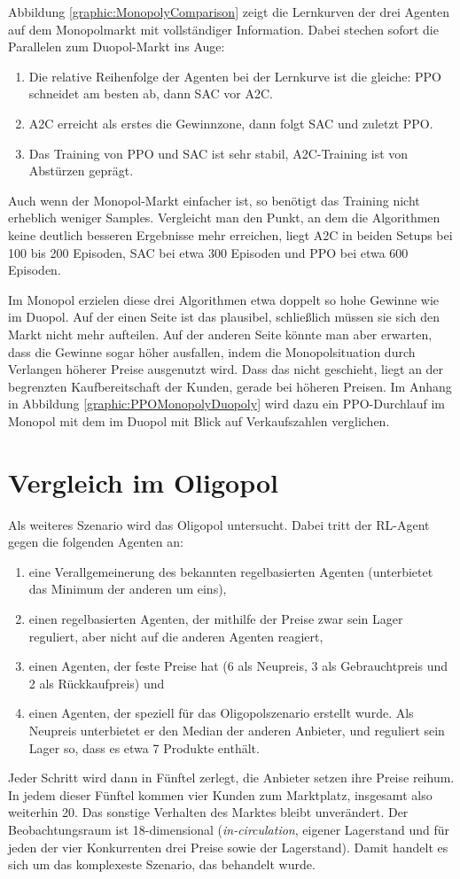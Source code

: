 Abbildung \ref{graphic:MonopolyComparison} zeigt die Lernkurven der drei Agenten auf dem Monopolmarkt mit vollständiger Information.
Dabei stechen sofort die Parallelen zum Duopol-Markt ins Auge:
\begin{enumerate}
	\item Die relative Reihenfolge der Agenten bei der Lernkurve ist die gleiche: PPO schneidet am besten ab, dann SAC vor A2C.
	\item A2C erreicht als erstes die Gewinnzone, dann folgt SAC und zuletzt PPO.
	\item Das Training von PPO und SAC ist sehr stabil, A2C-Training ist von Abstürzen geprägt.
\end{enumerate}
Auch wenn der Monopol-Markt einfacher ist, so benötigt das Training nicht erheblich weniger Samples.
Vergleicht man den Punkt, an dem die Algorithmen keine deutlich besseren Ergebnisse mehr erreichen, liegt A2C in beiden Setups bei 100 bis 200 Episoden, SAC bei etwa 300 Episoden und PPO bei etwa 600 Episoden.

Im Monopol erzielen diese drei Algorithmen etwa doppelt so hohe Gewinne wie im Duopol.
Auf der einen Seite ist das plausibel, schließlich müssen sie sich den Markt nicht mehr aufteilen.
Auf der anderen Seite könnte man aber erwarten, dass die Gewinne sogar höher ausfallen, indem die Monopolsituation durch Verlangen höherer Preise ausgenutzt wird.
Dass das nicht geschieht, liegt an der begrenzten Kaufbereitschaft der Kunden, gerade bei höheren Preisen.
Im Anhang in Abbildung \ref{graphic:PPOMonopolyDuopoly} wird dazu ein PPO-Durchlauf im Monopol mit dem im Duopol mit Blick auf Verkaufszahlen verglichen.

\section{Vergleich im Oligopol}
Als weiteres Szenario wird das Oligopol untersucht.
Dabei tritt der RL-Agent gegen die folgenden Agenten an:
\begin{enumerate}
	\item eine Verallgemeinerung des bekannten regelbasierten Agenten (unterbietet das Minimum der anderen um eins),
	\item einen regelbasierten Agenten, der mithilfe der Preise zwar sein Lager reguliert, aber nicht auf die anderen Agenten reagiert,
	\item einen Agenten, der feste Preise hat (6 als Neupreis, 3 als Gebrauchtpreis und 2 als Rückkaufpreis) und
	\item einen Agenten, der speziell für das Oligopolszenario erstellt wurde.
	Als Neupreis unterbietet er den Median der anderen Anbieter, und reguliert sein Lager so, dass es etwa 7 Produkte enthält.
\end{enumerate}
Jeder Schritt wird dann in Fünftel zerlegt, die Anbieter setzen ihre Preise reihum.
In jedem dieser Fünftel kommen vier Kunden zum Marktplatz, insgesamt also weiterhin 20.
Das sonstige Verhalten des Marktes bleibt unverändert.
Der Beobachtungsraum ist 18-dimensional (\textit{in-circulation}, eigener Lagerstand und für jeden der vier Konkurrenten drei Preise sowie der Lagerstand).
Damit handelt es sich um das komplexeste Szenario, das behandelt wurde.


